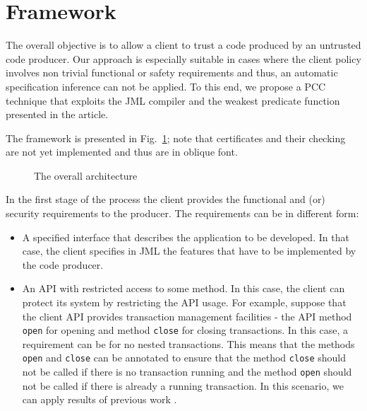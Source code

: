 \section{Framework}
\label{architecture_s}	


The overall objective is to allow a client to trust a code produced by an untrusted code producer. Our approach is especially suitable
 in cases where the client policy involves non trivial functional or safety requirements and thus, an automatic specification inference
 can not be applied. To this end, we propose a PCC technique that exploits the JML compiler and the weakest predicate function presented in the article. 
 
 The framework is presented in Fig.~\ref{architecture}; note that certificates and their checking are not yet implemented
 and thus are in oblique font.
  

\begin{figure}[!tbp]
\begin{center}
\caption{\sc The overall architecture}
\label{architecture}
\end{center}
\end{figure}
\clearpage

In the first stage of the process the client provides the functional and (or) security requirements to the producer.
 The requirements can be in different form:
\begin{itemize}
\item A specified interface that describes the application to be developed. In that case,
 the client specifies in JML the features that have to be implemented by the code producer.
\item An API with restricted access to some method. In this case, the client can protect its system by restricting the API usage.
For example, suppose that the client API provides transaction management facilities - the API method \texttt{open} for opening and method 
\texttt{close} for closing transactions. In this case, a requirement can be for no nested transactions.
This means that the methods \texttt{open} and \texttt{close} can be annotated to ensure that the method \texttt{close} 
 should not be called if there is no transaction running and the method \texttt{open} should not be called if there is already a running transaction. 
In this scenario, we can apply results of previous work \cite{PBBHL}.  
\end{itemize}

